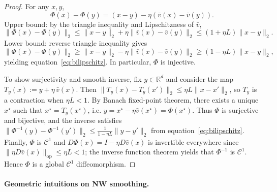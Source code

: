 \documentclass{article} %
\def\eqref#1{equation~\ref{#1}}
\newcommand{\R}{\mathbb{R}}
\theoremstyle{plain}
\theoremstyle{definition}
\theoremstyle{remark}
\begin{document}
\begin{proof}
For any $x,y$,
\[
\Phi(x)-\Phi(y)=(x-y)-\eta(\bar v(x)-\bar v(y)).
\]
Upper bound: by the triangle inequality and Lipschitzness of $\bar v$,
\[
\|\Phi(x)-\Phi(y)\|_2 \le \|x-y\|_2 + \eta\|\bar v(x)-\bar v(y)\|_2 \le (1+\eta L)\|x-y\|_2.
\]
Lower bound: reverse triangle inequality gives
\[
\|\Phi(x)-\Phi(y)\|_2 \ge \|x-y\|_2 - \eta\|\bar v(x)-\bar v(y)\|_2 \ge (1-\eta L)\|x-y\|_2,
\]
yielding \eqref{eq:bilipschitz}. In particular, $\Phi$ is injective.

To show surjectivity and smooth inverse, fix $y\in\R^d$ and consider the map
$T_y(x):=y+\eta\,\bar v(x)$. Then
$\|T_y(x)-T_y(x')\|_2 \le \eta L \|x-x'\|_2$, so $T_y$ is a contraction when $\eta L<1$.
By Banach fixed-point theorem, there exists a unique $x^\star$ such that $x^\star=T_y(x^\star)$, i.e.
$y=x^\star-\eta\bar v(x^\star)=\Phi(x^\star)$. Thus $\Phi$ is surjective and bijective, and the inverse satisfies
$\|\Phi^{-1}(y)-\Phi^{-1}(y')\|_2 \le \frac{1}{1-\eta L}\|y-y'\|_2$ from \eqref{eq:bilipschitz}.
Finally, $\Phi$ is $\mathcal{C}^1$ and $D\Phi(x)=I-\eta D\bar v(x)$ is invertible everywhere
since $\|\eta D\bar v(x)\|_{\mathrm{op}}\le \eta L<1$; the inverse function theorem yields that $\Phi^{-1}$ is
$\mathcal{C}^1$. Hence $\Phi$ is a global $\mathcal{C}^1$ diffeomorphism.
\end{proof}
\fi


\paragraph{Geometric intuitions on NW smoothing.}

\end{document}

